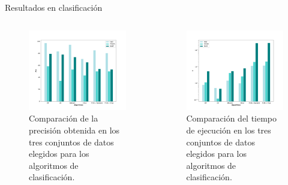 \documentclass[10pt, spanish]{beamer}
\begin{document}
\begin{frame}{Resultados en clasificación}
\begin{columns}[T]
\begin{column}{.48\textwidth}

\begin{figure}
	\centering
	\includegraphics[width=1.1\textwidth]{img/acc-class}
	\caption{\footnotesize Comparación de la precisión obtenida en los tres conjuntos de datos elegidos para los algoritmos de clasificación.}
\end{figure}
\end{column}%
\hfill%
\begin{column}{.48\textwidth}

\begin{figure}
	\centering
	\includegraphics[width=1.1\textwidth]{img/time-class}
	\caption{\footnotesize Comparación del tiempo de ejecución en los tres conjuntos de datos elegidos para los algoritmos de clasificación.}
\end{figure}
\end{column}%
\end{columns}
\end{frame}
\end{document}
